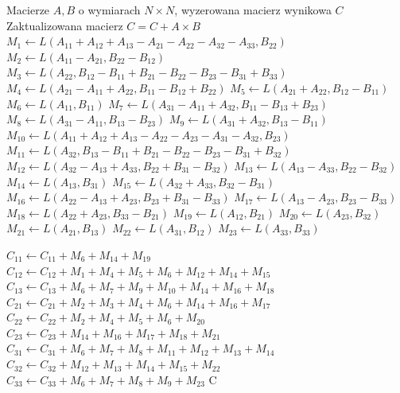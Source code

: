 \documentclass[twoside]{article}
\begin{document}
\begin{algorithm}[H]
\caption{Algorytm Ladermana}
\label{alg:laderman}
\begin{algorithmic}[1]
\Require Macierze $A, B$ o wymiarach $N \times N$, wyzerowana macierz wynikowa $C$
\Ensure Zaktualizowana macierz $C = C + A \times B$
        \State \Return {}
        \State 
    \EndIf
    \State $M_1 \gets L(A_{11} + A_{12} + A_{13} - A_{21} - A_{22} - A_{32} - A_{33}, B_{22})$ 
    \State $M_2 \gets L(A_{11} - A_{21}, B_{22} - B_{12})$ 
    \State $M_3 \gets L(A_{22}, B_{12} - B_{11} + B_{21} - B_{22} - B_{23} - B_{31} + B_{33}) $  
        \State $M_4 \gets L(A_{21} - A_{11} + A_{22}, B_{11} - B_{12} + B_{22}) $ 
        \State $M_5 \gets L(A_{21} + A_{22}, B_{12} - B_{11}) $ 
        \State $M_6 \gets L(A_{11}, B_{11}) $ 
        \State $M_7 \gets L(A_{31} - A_{11} + A_{32}, B_{11} - B_{13} + B_{23}) $ 
        \State $M_8 \gets L(A_{31} - A_{11}, B_{13} - B_{23}) $ 
        \State $M_9 \gets L(A_{31} + A_{32}, B_{13} - B_{11}) $ 
        \State $M_{10} \gets L(A_{11} + A_{12} + A_{13} - A_{22} - A_{23} - A_{31} - A_{32}, B_{23}) $ 
        \State $M_{11} \gets L(A_{32}, B_{13} - B_{11} + B_{21} - B_{22} - B_{23} - B_{31} + B_{32}) $ 
        \State $M_{12} \gets L(A_{32} - A_{13} + A_{33}, B_{22} + B_{31} - B_{32}) $ 
        \State $M_{13} \gets L(A_{13} - A_{33}, B_{22} - B_{32}) $ 
        \State $M_{14} \gets L(A_{13}, B_{31}) $ 
        \State $M_{15} \gets L(A_{32} + A_{33}, B_{32} - B_{31}) $ 
        \State $M_{16} \gets L(A_{22} - A_{13} + A_{23}, B_{23} + B_{31} - B_{33}) $ 
        \State $M_{17} \gets L(A_{13} - A_{23}, B_{23} - B_{33}) $ 
        \State $M_{18} \gets L(A_{22} + A_{23}, B_{33} - B_{21}) $ 
        \State $M_{19} \gets L(A_{12}, B_{21}) $ 
        \State $M_{20} \gets L(A_{23}, B_{32}) $ 
        \State $M_{21} \gets L(A_{21}, B_{13}) $ 
        \State $M_{22} \gets L(A_{31}, B_{12}) $ 
        \State $M_{23} \gets L(A_{33}, B_{33}) $
        

    \State $C_{11} \gets C_{11} + M_6 + M_{14} + M_{19}$
    \State $C_{12} \gets C_{12} + M_1 + M_4 + M_5 + M_6 + M_{12} + M_{14} + M_{15}$
    \State $C_{13} \gets C_{13} + M_6 + M_7 + M_9 + M_{10} + M_{14} + M_{16} + M_{18}$
    \State $C_{21} \gets C_{21} + M_2 + M_3 + M_4 + M_6 + M_{14} + M_{16} + M_{17}$
    \State $C_{22} \gets C_{22} + M_2 + M_4 + M_5 + M_6 + M_{20}$
    \State $C_{23} \gets C_{23} + M_{14} + M_{16} + M_{17} + M_{18} + M_{21}$
    \State $C_{31} \gets C_{31} + M_6 + M_7 + M_8 + M_{11} + M_{12} + M_{13} + M_{14}$
    \State $C_{32} \gets C_{32} + M_{12} + M_{13} + M_{14} + M_{15} + M_{22}$
    \State $C_{33} \gets C_{33} + M_6 + M_7 + M_8 + M_9 + M_{23}$
    \State \Return C
\EndFunction
\end{algorithmic}
\end{algorithm}
\end{document}
